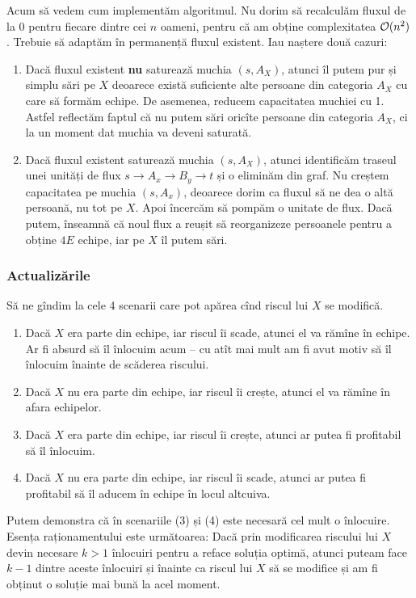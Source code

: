 \documentclass[../main.tex]{subfiles}
\begin{document}
Acum să vedem cum implementăm algoritmul. Nu dorim să recalculăm fluxul de la 0 pentru fiecare dintre cei $n$ oameni, pentru că am obține complexitatea $\mathcal{O}(n^2)$. Trebuie să adaptăm în permanență fluxul existent. Iau naștere două cazuri:

\begin{enumerate}
  \item Dacă fluxul existent \textbf{nu} saturează muchia $(s, A_X)$, atunci îl putem pur și simplu sări pe $X$ deoarece există suficiente alte persoane din categoria $A_X$ cu care să formăm echipe. De asemenea, reducem capacitatea muchiei cu 1. Astfel reflectăm faptul că nu putem sări oricîte persoane din categoria $A_X$, ci la un moment dat muchia va deveni saturată.
  \item Dacă fluxul existent saturează muchia $(s, A_X)$, atunci identificăm traseul unei unități de flux $s \to A_x \to B_y \to t$ și o eliminăm din graf. Nu creștem capacitatea pe muchia $(s, A_x)$, deoarece dorim ca fluxul să ne dea o altă persoană, nu tot pe $X$. Apoi încercăm să pompăm o unitate de flux. Dacă putem, înseamnă că noul flux a reușit să reorganizeze persoanele pentru a obține $4E$ echipe, iar pe $X$ îl putem sări.
\end{enumerate}

\subsubsection*{Actualizările}

Să ne gîndim la cele 4 scenarii care pot apărea cînd riscul lui $X$ se modifică.

\begin{enumerate}
  \item Dacă $X$ era parte din echipe, iar riscul îi scade, atunci el va rămîne în echipe. Ar fi absurd să îl înlocuim acum -- cu atît mai mult am fi avut motiv să îl înlocuim înainte de scăderea riscului.
  \item Dacă $X$ nu era parte din echipe, iar riscul îi crește, atunci el va rămîne în afara echipelor.
  \item Dacă $X$ era parte din echipe, iar riscul îi crește, atunci ar putea fi profitabil să îl înlocuim.
  \item Dacă $X$ nu era parte din echipe, iar riscul îi scade, atunci ar putea fi profitabil să îl aducem în echipe în locul altcuiva.
\end{enumerate}

Putem demonstra că în scenariile (3) și (4) este necesară cel mult o înlocuire. Esența raționamentului este următoarea: Dacă prin modificarea riscului lui $X$ devin necesare $k > 1$ înlocuiri pentru a reface soluția optimă, atunci puteam face $k-1$ dintre aceste înlocuiri și înainte ca riscul lui $X$ să se modifice și am fi obținut o soluție mai bună la acel moment.
\end{document}
